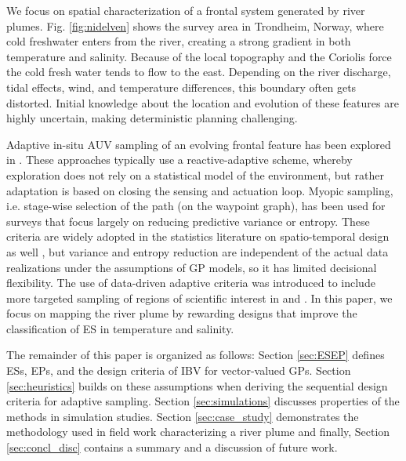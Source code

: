 \documentclass[aoas]{imsart}
\begin{document}
We focus on spatial characterization of a frontal system generated by
river plumes. Fig. \ref{fig:nidelven} shows the survey area in
Trondheim, Norway, where cold freshwater enters from the river,
creating a strong gradient in both temperature and salinity. Because
of the local topography and the Coriolis force the cold fresh water
tends to flow to the east. Depending on the river discharge, tidal
effects, wind, and temperature differences, this boundary often gets
distorted. Initial knowledge about the location and evolution of these
features are highly uncertain, making deterministic planning
challenging.

Adaptive in-situ AUV sampling of an evolving frontal feature has been
explored in \cite{fronts11,Zhang2012,Pinto2018,costa19}. These
approaches typically use a reactive-adaptive scheme, whereby
exploration does not rely on a statistical model of the environment,
but rather adaptation is based on closing the sensing and actuation
loop. Myopic sampling, i.e. stage-wise selection of the path (on the
waypoint graph), has been used for surveys
\citep{singh2009efficient,Binney2013} that focus largely on reducing
predictive variance or entropy. These criteria are widely adopted in
the statistics literature on spatio-temporal design as well
\cite{bueso1998state,zidek2019monitoring}, but variance and entropy
reduction are independent of the actual data realizations under the
assumptions of GP models, so it has limited
decisional flexibility. The use of data-driven adaptive criteria
was introduced to include more targeted sampling of regions of
scientific interest in \cite{Low2009} and \cite{fossuminformation}. In
this paper, we focus on mapping the river plume by rewarding designs
that improve the classification of ES in temperature and salinity.

The remainder of this paper is organized as follows: 
Section \ref{sec:ESEP} defines ESs, EPs, and the design criteria of IBV for
vector-valued GPs. Section \ref{sec:heuristics} builds on these
assumptions when deriving the sequential design criteria for adaptive
sampling. Section \ref{sec:simulations} discusses properties of the
methods in simulation studies. Section \ref{sec:case_study}
demonstrates the methodology used in field work characterizing a river
plume and finally, Section \ref{sec:concl_disc} contains a summary and
a discussion of future work.
\end{document}
